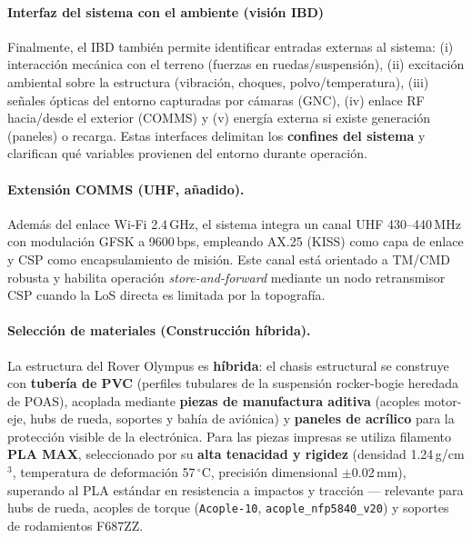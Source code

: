 \paragraph{Interfaz del sistema con el ambiente (visión IBD)}
Finalmente, el IBD también permite identificar entradas externas al sistema: (i) interacción mecánica con el terreno (fuerzas en ruedas/suspensión), (ii) excitación ambiental sobre la estructura (vibración, choques, polvo/temperatura), (iii) señales ópticas del entorno capturadas por cámaras (GNC), (iv) enlace RF hacia/desde el exterior (COMMS) y (v) energía externa si existe generación (paneles) o recarga. Estas interfaces delimitan los \textbf{confines del sistema} y clarifican qué variables provienen del entorno durante operación.

\paragraph{Extensión COMMS (UHF, añadido).}
Además del enlace Wi‑Fi 2.4\,GHz, el sistema integra un canal UHF 430–440\,MHz con
modulación GFSK a 9600\,bps, empleando AX.25 (KISS) como capa de enlace y CSP como
encapsulamiento de misión. Este canal está orientado a TM/CMD robusta y habilita
operación \emph{store-and-forward} mediante un nodo retransmisor CSP cuando la LoS
directa es limitada por la topografía.

\paragraph{Selección de materiales (Construcción híbrida).}
La estructura del Rover Olympus es \textbf{híbrida}: el chasis estructural se construye con \textbf{tubería de PVC} (perfiles tubulares de la suspensión rocker-bogie heredada de POAS), acoplada mediante \textbf{piezas de manufactura aditiva} (acoples motor-eje, hubs de rueda, soportes y bahía de aviónica) y \textbf{paneles de acrílico} para la protección visible de la electrónica. Para las piezas impresas se utiliza filamento \textbf{PLA MAX}, seleccionado por su \textbf{alta tenacidad y rigidez} (densidad 1.24\,g/cm$^3$, temperatura de deformación 57\,$^{\circ}\mathrm{C}$, precisión dimensional $\pm$0.02\,mm), superando al PLA estándar en resistencia a impactos y tracción --- relevante para hubs de rueda, acoples de torque (\texttt{Acople-10}, \texttt{acople\_nfp5840\_v20}) y soportes de rodamientos F687ZZ.


